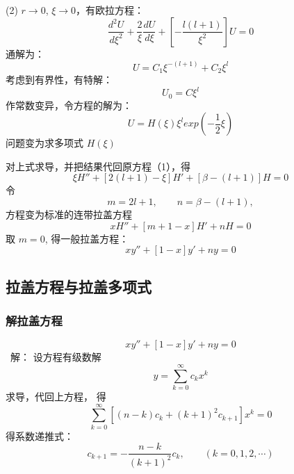 \begin{frame}
	(2) $r\to 0$, $\xi \to 0$，有欧拉方程：
	\begin{equation*}
		\frac{d^2 U}{d \xi ^2} + \frac{2}{\xi }\frac{d U }{d \xi}  +[ - \frac{l(l+1)}{\xi ^2}] U=0
	\end{equation*}	 
	通解为：
	\begin{equation*}
		U=C_1 \xi ^{-(l+1)}+C_2 \xi ^ l 
	\end{equation*}	
	考虑到有界性，有特解：
	\begin{equation*}
		U_0=C  \xi ^ l 
	\end{equation*}	
	作常数变异，令方程的解为：
	\begin{equation*}
		U=H(\xi)  \xi ^ l  exp(-\frac{1}{2}\xi ) 
	\end{equation*}	
	问题变为求多项式 $H(\xi)$
\end{frame}	

\begin{frame}
	对上式求导，并把结果代回原方程（1），得
	\begin{equation*}
		\xi H''  + [2(l+1) -\xi] H' +[\beta -(l+1)] H =0
	\end{equation*}	
	令
	\begin{equation*}
		m=2l+1, \qquad n=\beta-(l+1), 
	\end{equation*}	
	方程变为标准的连带拉盖方程
	\begin{equation*}
		\boxed{x H''  + [m+1 -x] H' +n H =0}
	\end{equation*}	
	取 $m=0$, 得一般拉盖方程：
	\begin{equation*}
		\boxed{x y''  + [1 -x] y' +n y =0}
	\end{equation*}	
\end{frame}	

\subsection{拉盖方程与拉盖多项式}

\begin{frame}
	\frametitle{解拉盖方程}
	\begin{equation*}
		\boxed{x y''  + [1 -x] y' +n y =0}
	\end{equation*}	
	\alert{ 解：} 设方程有级数解
	\begin{equation*}
		y=\sum_{k=0}^{\infty} c_k x^k
	\end{equation*}	
	求导，代回上方程， 得 
	\begin{equation*}
		\sum_{k=0}^{\infty} [(n-k)c_k +(k+1)^2 c_{k+1}  ] x^k =0
	\end{equation*}	
	得系数递推式：
	\begin{equation*}
		c_{k+1}=-\frac{n-k}{(k+1)^2} c_k, \qquad (k=0,1,2,\cdots)
	\end{equation*}	
\end{frame}	

